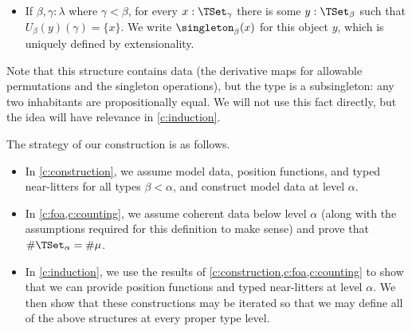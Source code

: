 \begin{definition}
\begin{itemize}
    \item If \( \beta, \gamma : \lambda \) where \( \gamma < \beta \), for every \( x : \TSet_\gamma \) there is some \( y : \TSet_\beta \) such that \( U_\beta(y)(\gamma) = \{ x \} \).
    We write \( \singleton_\beta(x) \) for this object \( y \), which is uniquely defined by extensionality.
  \end{itemize}
  Note that this structure contains data (the derivative maps for allowable permutations and the singleton operations), but the type is a subsingleton: any two inhabitants are propositionally equal.
  We will not use this fact directly, but the idea will have relevance in \cref{c:induction}.
\end{definition}
The strategy of our construction is as follows.
\begin{itemize}
  \item In \cref{c:construction}, we assume model data, position functions, and typed near-litters for all types \( \beta < \alpha \), and construct model data at level \( \alpha \).
  \item In \cref{c:foa,c:counting}, we assume coherent data below level \( \alpha \) (along with the assumptions required for this definition to make sense) and prove that \( \#\TSet_\alpha = \#\mu \).
  \item In \cref{c:induction}, we use the results of \cref{c:construction,c:foa,c:counting} to show that we can provide position functions and typed near-litters at level \( \alpha \).
  We then show that these constructions may be iterated so that we may define all of the above structures at every proper type level.
\end{itemize}


